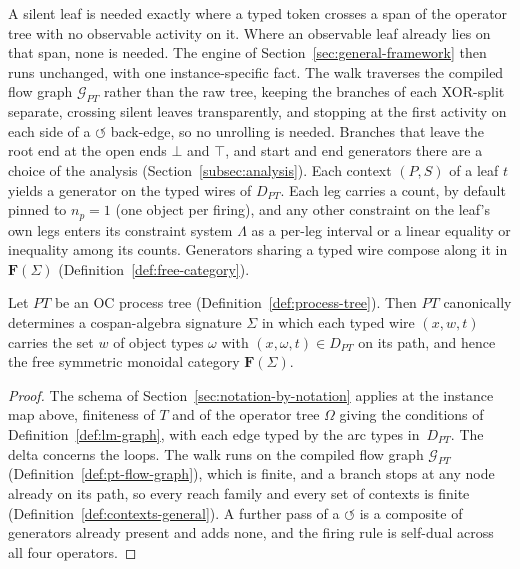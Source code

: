 A silent leaf is needed exactly where a typed token crosses a span of the operator tree with
no observable activity on it. Where an observable leaf already lies on that span, none is
needed. The engine of Section~\ref{sec:general-framework} then runs unchanged, with one
instance-specific fact. The walk traverses the compiled flow graph $\mathcal{G}_{PT}$ rather
than the raw tree, keeping the branches of each XOR-split separate, crossing silent leaves
transparently, and stopping at the first activity on each side of a $\circlearrowleft$ back-edge,
so no unrolling is needed. Branches that leave the root end at the open ends $\bot$ and $\top$, and
start and end generators there are a choice of the analysis (Section~\ref{subsec:analysis}). Each context $(P,S)$ of a leaf $t$
yields a generator on the typed wires of $D_{PT}$. Each leg carries a count, by default pinned to
$n_p=1$ (one object per firing), and any other constraint on the leaf's own legs enters its
constraint system $\Lambda$ as a per-leg interval or a linear equality or inequality among its counts.
Generators sharing a typed wire compose along it in $\mathbf{F}(\Sigma)$ (Definition~\ref{def:free-category}).

\begin{theorem}
  \label{thm:ptree-to-cospan-signature}
  Let $PT$ be an OC process tree (Definition~\ref{def:process-tree}). Then $PT$ canonically determines a cospan-algebra signature $\Sigma$ in which each typed wire $(x,w,t)$ carries the set $w$ of object types $\omega$ with $(x,\omega,t)\in D_{PT}$ on its path, and hence the free symmetric monoidal category $\mathbf{F}(\Sigma)$.
\end{theorem}

\begin{proof}
  The schema of Section~\ref{sec:notation-by-notation} applies at the instance map above,
  finiteness of $T$ and of the operator tree $\Omega$ giving the conditions of Definition~\ref{def:lm-graph}, with
  each edge typed by the arc types in~$D_{PT}$. The delta concerns the loops. The walk runs on the
  compiled flow graph $\mathcal{G}_{PT}$ (Definition~\ref{def:pt-flow-graph}), which is finite, and a
  branch stops at any node already on its path, so every reach family and every set of contexts is
  finite (Definition~\ref{def:contexts-general}). A further pass of a $\circlearrowleft$ is a
  composite of generators already present and adds none, and the firing rule is self-dual across
  all four operators.
\end{proof}

